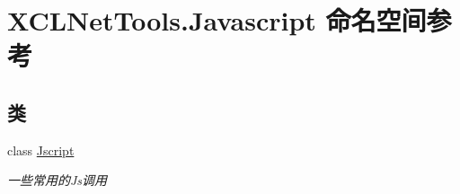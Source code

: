 \hypertarget{namespace_x_c_l_net_tools_1_1_javascript}{}\section{X\+C\+L\+Net\+Tools.\+Javascript 命名空间参考}
\label{namespace_x_c_l_net_tools_1_1_javascript}
\subsection*{类}
\begin{DoxyCompactItemize}
\item 
class \hyperlink{class_x_c_l_net_tools_1_1_javascript_1_1_jscript}{Jscript}
\begin{DoxyCompactList}\small\item\em 一些常用的\+Js调用 \end{DoxyCompactList}\end{DoxyCompactItemize}
